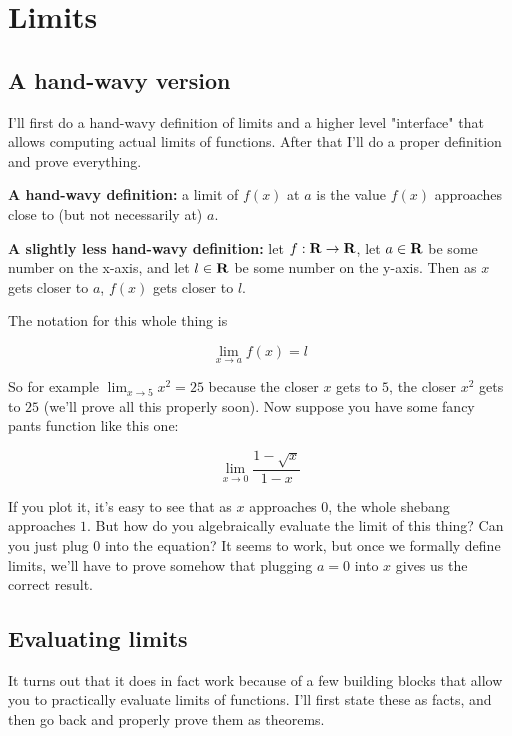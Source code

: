 \section{Limits}

\subsection{A hand-wavy version}

I'll first do a hand-wavy definition of limits and a higher level
"interface" that allows computing actual limits of functions. After
that I'll do a proper definition and prove everything.

\vs

\textbf{A hand-wavy definition:} a limit of $f(x)$ at $a$ is the value
$f(x)$ approaches close to (but not necessarily at) $a$.

\vs

\textbf{A slightly less hand-wavy definition:} let $f:\mathbf{R}\to\mathbf{R}$, let
$a\in\mathbf{R}$ be some number on the x-axis, and let $l\in\mathbf{R}$ be some number on
the y-axis. Then as $x$ gets closer to $a$, $f(x)$ gets closer to $l$.

\vs

The notation for this whole thing is

\[\lim_{x\to a} f(x)=l\]

So for example $\lim_{x\to5}x^2=25$ because the closer $x$ gets to
$5$, the closer $x^2$ gets to $25$ (we'll prove all this properly
soon). Now suppose you have some fancy pants function like this one:

\[\lim_{x\to 0}\frac{1-\sqrt{x}}{1-x}\]

If you plot it, it's easy to see that as $x$ approaches $0$, the whole
shebang approaches $1$. But how do you algebraically evaluate the
limit of this thing? Can you just plug $0$ into the equation? It seems
to work, but once we formally define limits, we'll have to prove
somehow that plugging $a=0$ into $x$ gives us the correct result.

\subsection{Evaluating limits}

It turns out that it does in fact work because of a few building
blocks that allow you to practically evaluate limits of functions.
I'll first state these as facts, and then go back and properly prove
them as theorems.

